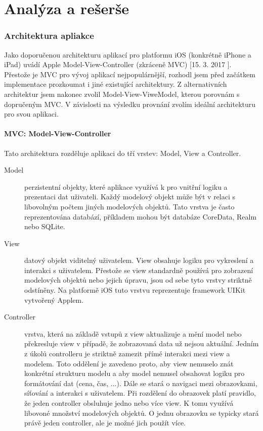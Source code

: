\chapter{Analýza a rešerše}

\subsection{Architektura apliakce}

Jako doporučenou architekturu aplikací pro platformu iOS (konkrétně iPhone a iPad) uvádí Apple Model-View-Controller (zkráceně MVC) [15. 3. 2017 ].
Přestože je MVC pro vývoj aplikací nejpopulárnější, rozhodl jsem před začátkem implementace prozkoumat i jiné existující architektury.
Z alternativních architektur jsem nakonec zvolil Model-View-ViweModel, kterou porovnám s dopručeným MVC.
V závislosti na výsledku provnání zvolím ideální architekturu pro svou aplikaci.

\subsubsection{MVC: Model-View-Controller}
Tato architektura rozděluje aplikaci do tří vrstev: Model, View a Controller.

\begin{description}
  \item[Model] perzistentní objekty, které aplikace využívá k pro vnitřní logiku a prezentaci dat uživateli.
  Každý modelový objekt může být v relaci s libovolným počtem jiných modelových objektů.
  Tato vrstva je často reprezentována databází, příkladem mohou být databáze CoreData, Realm nebo SQLite.

  \item[View] datový objekt viditelný uživatelem. View obsahuje logiku pro vykreslení a interakci s uživatelem.
  Přestože se view standardně používá pro zobrazení modelových objektů nebo jejich úpravu, jsou od sebe tyto vrstvy striktně odstíněny.
  Na platformě iOS tuto vrstvu reprezentuje framework UIKit vytvořený Applem.

  \item[Controller] vrstva, která na základě vstupů z view aktualizuje a mění model nebo překresluje view v případě, že zobrazovaná data už nejsou aktuální.
  Jedním z úkolů controlleru je striktně zamezit přímé interakci mezi view a modelem.
  Toto oddělení je zavedeno proto, aby view nemuselo znát konkrétní strukturu modelu a aby model nemusel obsahovat logiku pro formátování dat (cena, čas, ...).
  Dále se stará o navigaci mezi obrazovkami, síťování a interakci s uživatelem.
  Při rozdělení do obrazovek platí pravidlo, že jeden controller obsluhuje jedno nebo více view.
  K tomu využívá libovoné množství modelových objektů.
  O jednu obrazovku se typicky stará právě jeden controller, ale je možné jich použít více.
\end{description}

